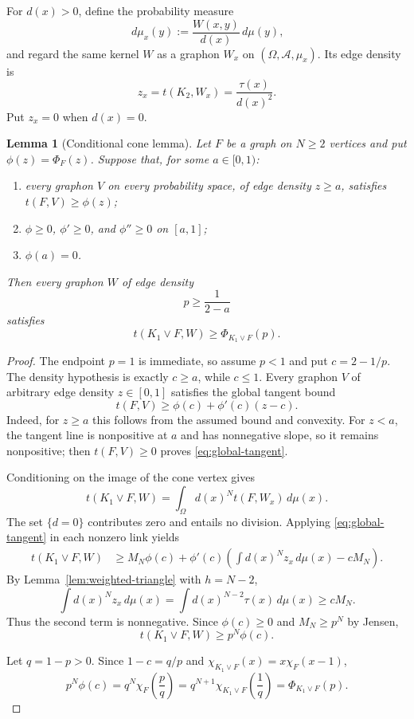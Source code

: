 \documentclass[11pt]{article}
\newtheorem{lemma}[theorem]{Lemma}
\newcommand{\dd}{\,d}
\begin{document}
For $d(x)>0$, define the probability measure
\[
 \dd\mu_x(y):=\frac{W(x,y)}{d(x)}\dd\mu(y),
\]
and regard the same kernel $W$ as a graphon $W_x$ on
$(\Omega,\mathcal A,\mu_x)$.  Its edge density is
\[
 z_x=t(K_2,W_x)=\frac{\tau(x)}{d(x)^2}.
\]
Put $z_x=0$ when $d(x)=0$.

\begin{lemma}[Conditional cone lemma]\label{lem:cone}
Let $F$ be a graph on $N\geq2$ vertices and put
$\phi(z)=\Phi_F(z)$.  Suppose that, for some $a\in[0,1)$:
\begin{enumerate}
 \item every graphon $V$ on every probability space, of edge density
 $z\geq a$, satisfies $t(F,V)\geq\phi(z)$;
 \item $\phi\geq0$, $\phi'\geq0$, and $\phi''\geq0$ on $[a,1]$;
 \item $\phi(a)=0$.
\end{enumerate}
Then every graphon $W$ of edge density
\[
 p\geq\frac1{2-a}
\]
satisfies
\[
 t(K_1\vee F,W)\geq\Phi_{K_1\vee F}(p).
\]
\end{lemma}

\begin{proof}
The endpoint $p=1$ is immediate, so assume $p<1$ and put
$c=2-1/p$.  The density hypothesis is exactly $c\geq a$, while
$c\leq1$.  Every graphon $V$ of arbitrary edge density $z\in[0,1]$
satisfies the global tangent bound
\begin{equation}
 t(F,V)\geq\phi(c)+\phi'(c)(z-c).
 \label{eq:global-tangent}
\end{equation}
Indeed, for $z\geq a$ this follows from the assumed bound and
convexity.  For $z<a$, the tangent line is nonpositive at $a$ and has
nonnegative slope, so it remains nonpositive; then
$t(F,V)\geq0$ proves \eqref{eq:global-tangent}.

Conditioning on the image of the cone vertex gives
\[
 t(K_1\vee F,W)=\int_\Omega d(x)^N t(F,W_x)\dd\mu(x).
\]
The set $\{d=0\}$ contributes zero and entails no division.  Applying
\eqref{eq:global-tangent} in each nonzero link yields
\begin{align*}
 t(K_1\vee F,W)
 &\geq M_N\phi(c)
 +\phi'(c)\left(\int d(x)^Nz_x\dd\mu(x)-cM_N\right).
\end{align*}
By Lemma~\ref{lem:weighted-triangle} with $h=N-2$,
\[
 \int d(x)^Nz_x\dd\mu(x)
 =\int d(x)^{N-2}\tau(x)\dd\mu(x)
 \geq cM_N.
\]
Thus the second term is nonnegative.  Since $\phi(c)\geq0$ and
$M_N\geq p^N$ by Jensen,
\[
 t(K_1\vee F,W)\geq p^N\phi(c).
\]

Let $q=1-p>0$.  Since $1-c=q/p$ and
$\chi_{K_1\vee F}(x)=x\chi_F(x-1)$,
\[
 p^N\phi(c)
 =q^N\chi_F\!\left(\frac pq\right)
 =q^{N+1}\chi_{K_1\vee F}\!\left(\frac1q\right)
 =\Phi_{K_1\vee F}(p).
\]
\end{proof}
\end{document}
